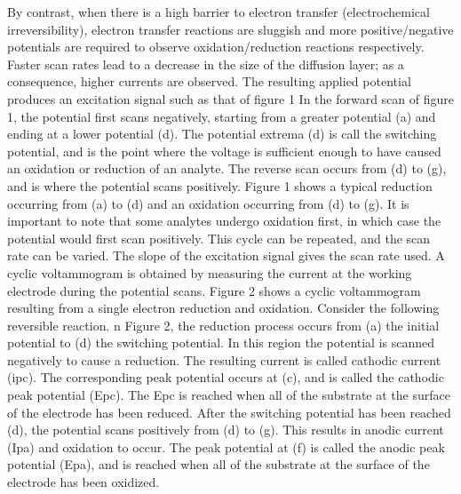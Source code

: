 By contrast, when there is a high barrier to electron transfer (electrochemical irreversibility), electron transfer reactions are sluggish and more positive/negative potentials are required to observe oxidation/reduction reactions respectively. Faster scan rates lead to a decrease in the size of the diffusion layer; as a consequence, higher currents are observed.
The resulting applied potential produces an excitation signal such as that of figure 1 In the forward scan of figure 1, the potential first scans negatively, starting from a greater potential (a) and ending at a lower potential (d). The potential extrema (d) is call the switching potential, and is the point where the voltage is sufficient enough to have caused an oxidation or reduction of an analyte. The reverse scan occurs from (d) to (g), and is where the potential scans positively. Figure 1 shows a typical reduction occurring from (a) to (d) and an oxidation occurring from (d) to (g). It is important to note that some analytes undergo oxidation first, in which case the potential would first scan positively. This cycle can be repeated, and the scan rate can be varied. The slope of the excitation signal gives the scan rate used.
A cyclic voltammogram is obtained by measuring the current at the working electrode during the potential scans. Figure 2 shows a cyclic voltammogram resulting from a single electron reduction and oxidation. Consider the following reversible reaction. n Figure 2, the reduction process occurs from (a) the initial potential to (d) the switching potential. In this region the potential is scanned negatively to cause a reduction. The resulting current is called cathodic current (ipc). The corresponding peak potential occurs at (c), and is called the cathodic peak potential (Epc). The Epc is reached when all of the substrate at the surface of the electrode has been reduced. After the switching potential has been reached (d), the potential scans positively from (d) to (g). This results in anodic current (Ipa) and oxidation to occur. The peak potential at (f) is called the anodic peak potential (Epa), and is reached when all of the substrate at the surface of the electrode has been oxidized.
